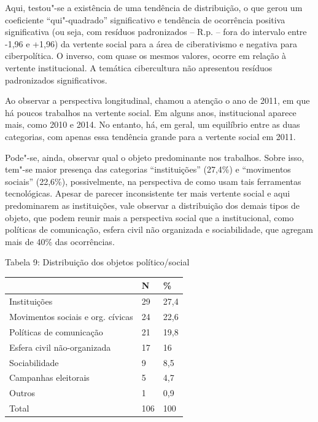 Aqui, testou"-se a existência de uma tendência de distribuição, o que
gerou um coeficiente ``qui"-quadrado'' significativo e tendência de
ocorrência positiva significativa (ou seja, com resíduos padronizados --
R.p. -- fora do intervalo entre -1,96 e +1,96) da vertente social para a
área de ciberativismo e negativa para ciberpolítica. O inverso, com
quase os mesmos valores, ocorre em relação à vertente institucional. A
temática cibercultura não apresentou resíduos padronizados
significativos.

Ao observar a perspectiva longitudinal, chamou a atenção o ano de 2011,
em que há poucos trabalhos na vertente social. Em alguns anos,
institucional aparece mais, como 2010 e 2014. No entanto, há, em geral,
um equilíbrio entre as duas categorias, com apenas essa tendência grande
para a vertente social em 2011.

Pode"-se, ainda, observar qual o objeto predominante nos trabalhos. Sobre
isso, tem"-se maior presença das categorias ``instituições'' (27,4\%) e
``movimentos sociais'' (22,6\%), possivelmente, na perspectiva de como
usam tais ferramentas tecnológicas. Apesar de parecer inconsistente ter
mais vertente social e aqui predominarem as instituições, vale observar
a distribuição dos demais tipos de objeto, que podem reunir mais a
perspectiva social que a institucional, como políticas de comunicação,
esfera civil não organizada e sociabilidade, que agregam mais de 40\%
das ocorrências.

\begin{center}
Tabela 9: Distribuição dos objetos político/social
\end{center}

\begin{center}
\centering
\begin{tabular}{|l|l|l|}
\hline
 & \textbf{N} & \textbf{\%} \\ \hline
Instituições & 29 & 27,4 \\ \hline
Movimentos sociais e org. cívicas & 24 & 22,6 \\ \hline
Políticas de comunicação & 21 & 19,8 \\ \hline
Esfera civil não-organizada & 17 & 16 \\ \hline
Sociabilidade & 9 & 8,5 \\ \hline
Campanhas eleitorais & 5 & 4,7 \\ \hline
Outros & 1 & 0,9 \\ \hline
Total & 106 & 100 \\ \hline
\end{tabular}
\end{center}

